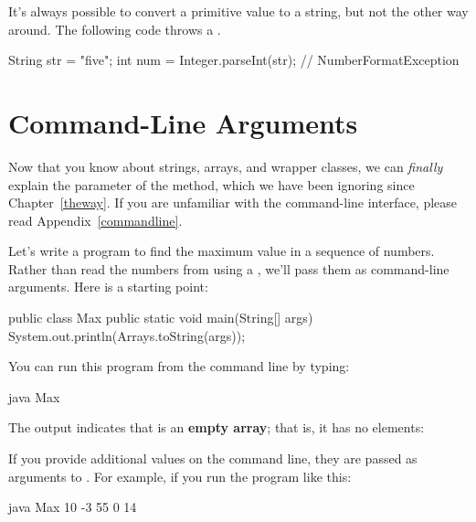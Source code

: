 
It's always possible to convert a primitive value to a string, but not the other way around.
The following code throws a .

\begin{code}
String str = "five";
int num = Integer.parseInt(str);  // NumberFormatException
\end{code}


\section{Command-Line Arguments}


Now that you know about strings, arrays, and wrapper classes, we can {\em finally} explain the  parameter of the  method, which we have been ignoring since Chapter~\ref{theway}.
If you are unfamiliar with the command-line interface, please read Appendix~\ref{commandline}.

Let's write a program to find the maximum value in a sequence of numbers.
Rather than read the numbers from  using a , we'll pass them as command-line arguments.
Here is a starting point:

\begin{code}
public class Max {
    public static void main(String[] args) {
        System.out.println(Arrays.toString(args));
    }
}
\end{code}

You can run this program from the command line by typing:

\begin{stdout}
java Max
\end{stdout}


The output indicates that  is an {\bf empty array}; that is, it has no elements:

\begin{stdout}
[]
\end{stdout}

If you provide additional values on the command line, they are passed as arguments to .
For example, if you run the program like this:

\begin{stdout}
java Max 10 -3 55 0 14
\end{stdout}

